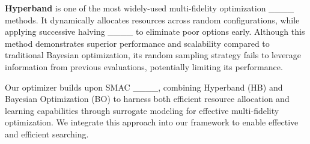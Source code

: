 \textbf{Hyperband} is one of the most widely-used multi-fidelity optimization ____ methods. It dynamically allocates resources across random configurations, while applying successive halving ____ to eliminate poor options early. Although this method demonstrates superior performance and scalability compared to traditional Bayesian optimization, its random sampling strategy fails to leverage information from previous evaluations, potentially limiting its performance. 

Our optimizer builds upon SMAC ____, combining Hyperband (HB) and Bayesian Optimization (BO) to harness both efficient resource allocation and learning capabilities through surrogate modeling for effective multi-fidelity optimization. We integrate this approach into our framework to enable effective and efficient searching.


